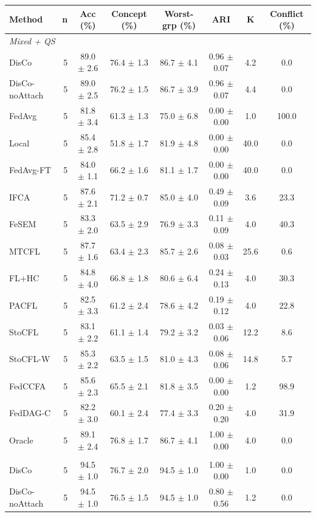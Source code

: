 {\scriptsize
\begin{tabular}{l r c c c c c c}
\toprule
Method & n & Acc (\%) & Concept (\%) & Worst-grp (\%) & ARI & K & Conflict (\%) \\
\midrule
\multicolumn{8}{l}{\textit{Mixed + QS}} \\
DisCo & 5 & 89.0 $\pm$ 2.6 & 76.4 $\pm$ 1.3 & 86.7 $\pm$ 4.1 & 0.96 $\pm$ 0.07 & 4.2 & 0.0 \\
DisCo-noAttach & 5 & 89.0 $\pm$ 2.5 & 76.2 $\pm$ 1.5 & 86.7 $\pm$ 3.9 & 0.96 $\pm$ 0.07 & 4.4 & 0.0 \\
FedAvg & 5 & 81.8 $\pm$ 3.4 & 61.3 $\pm$ 1.3 & 75.0 $\pm$ 6.8 & 0.00 $\pm$ 0.00 & 1.0 & 100.0 \\
Local & 5 & 85.4 $\pm$ 2.8 & 51.8 $\pm$ 1.7 & 81.9 $\pm$ 4.8 & 0.00 $\pm$ 0.00 & 40.0 & 0.0 \\
FedAvg-FT & 5 & 84.0 $\pm$ 1.1 & 66.2 $\pm$ 1.6 & 81.1 $\pm$ 1.7 & 0.00 $\pm$ 0.00 & 40.0 & 0.0 \\
IFCA & 5 & 87.6 $\pm$ 2.1 & 71.2 $\pm$ 0.7 & 85.0 $\pm$ 4.0 & 0.49 $\pm$ 0.09 & 3.6 & 23.3 \\
FeSEM & 5 & 83.3 $\pm$ 2.0 & 63.5 $\pm$ 2.9 & 76.9 $\pm$ 3.3 & 0.11 $\pm$ 0.09 & 4.0 & 40.3 \\
MTCFL & 5 & 87.7 $\pm$ 1.6 & 63.4 $\pm$ 2.3 & 85.7 $\pm$ 2.6 & 0.08 $\pm$ 0.03 & 25.6 & 0.6 \\
FL+HC & 5 & 84.8 $\pm$ 4.0 & 66.8 $\pm$ 1.8 & 80.6 $\pm$ 6.4 & 0.24 $\pm$ 0.13 & 4.0 & 30.3 \\
PACFL & 5 & 82.5 $\pm$ 3.3 & 61.2 $\pm$ 2.4 & 78.6 $\pm$ 4.2 & 0.19 $\pm$ 0.12 & 4.0 & 22.8 \\
StoCFL & 5 & 83.1 $\pm$ 2.2 & 61.1 $\pm$ 1.4 & 79.2 $\pm$ 3.2 & 0.03 $\pm$ 0.06 & 12.2 & 8.6 \\
StoCFL-W & 5 & 85.3 $\pm$ 2.2 & 63.5 $\pm$ 1.5 & 81.0 $\pm$ 4.3 & 0.08 $\pm$ 0.06 & 14.8 & 5.7 \\
FedCCFA & 5 & 85.6 $\pm$ 2.3 & 65.5 $\pm$ 2.1 & 81.8 $\pm$ 3.5 & 0.00 $\pm$ 0.00 & 1.2 & 98.9 \\
FedDAG-C & 5 & 82.2 $\pm$ 3.0 & 60.1 $\pm$ 2.4 & 77.4 $\pm$ 3.3 & 0.20 $\pm$ 0.20 & 4.0 & 31.9 \\
Oracle & 5 & 89.1 $\pm$ 2.4 & 76.8 $\pm$ 1.7 & 86.7 $\pm$ 4.1 & 1.00 $\pm$ 0.00 & 4.0 & 0.0 \\
\addlinespace
\multicolumn{8}{l}{\textit{Label skew only}} \\
DisCo & 5 & 94.5 $\pm$ 1.0 & 76.7 $\pm$ 2.0 & 94.5 $\pm$ 1.0 & 1.00 $\pm$ 0.00 & 1.0 & 0.0 \\
DisCo-noAttach & 5 & 94.5 $\pm$ 1.0 & 76.5 $\pm$ 1.5 & 94.5 $\pm$ 1.0 & 0.80 $\pm$ 0.56 & 1.2 & 0.0 \\

\end{tabular}}
